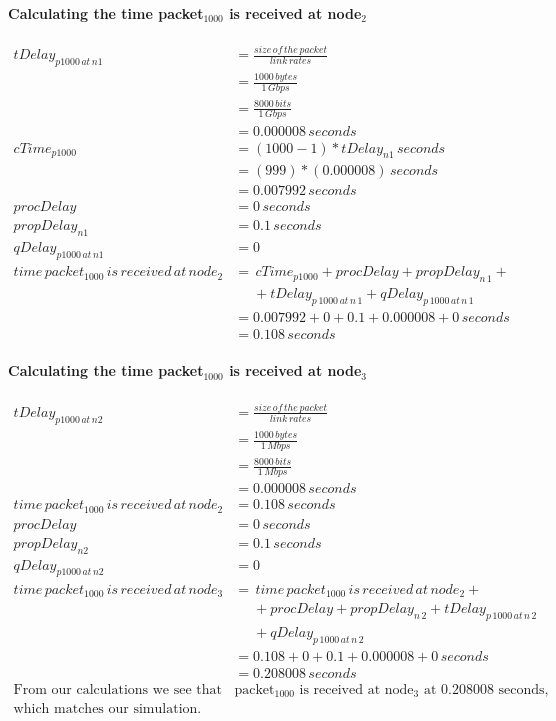 \documentclass[fleqn,11pt]{article}
\begin{document}
\paragraph{Calculating the time packet$_{1000}$ is received at node$_2$ }
\begin{align*}
tDelay_{p1000\,at\,n1} &=  \frac{size\,of\,the\,packet} {link\,rates}\\
&= \frac{1000\,bytes} {1\,Gbps}\\
&=  \frac{8000\,bits} {1\,Gbps}\\
&= 0.000008 \,seconds\\
cTime_{p1000} &= (1000-1) *tDelay_{n1}\,seconds\\
&= (999) *(0.000008)\,seconds\\
&= 0.007992\,seconds\\
procDelay &= 0\,seconds\\
propDelay_{n1} &= 0.1\,seconds\\
qDelay_{p1000\,at\,n1} &= 0\\
time\,packet_{1000}\,is\,received\,at\,node_{2} &= \,cTime_{p1000} + procDelay + propDelay_{n\,1} +\\
&\,\,\,\,\,\,\,\, + tDelay_{p\,1000\,at\,n\,1} + qDelay_{p\,1000\,at\,n\,1}\\
&= 0.007992 + 0 + 0.1 + 0.000008 + 0\,seconds\\
&= 0.108\,seconds
\end{align*}

\paragraph{Calculating the time packet$_{1000}$ is received at node$_3$ }
\begin{align*}
tDelay_{p1000\,at\,n2} &=  \frac{size\,of\,the\,packet} {link\,rates}\\
&= \frac{1000\,bytes} {1\,Mbps}\\
&=  \frac{8000\,bits} {1\,Mbps}\\
&= 0.000008 \,seconds\\
time\,packet_{1000}\,is\,received\,at\,node_{2} &= 0.108\,seconds\\
procDelay &= 0\,seconds\\
propDelay_{n2} &= 0.1\,seconds\\
qDelay_{p1000\,at\,n2} &= 0\\
time\,packet_{1000}\,is\,received\,at\,node_{3} &= \,time\,packet_{1000}\,is\,received\,at\,node_{2} + \\
&\,\,\,\,\,\,\,\, + procDelay + propDelay_{n\,2} + tDelay_{p\,1000\,at\,n\,2} \\
&\,\,\,\,\,\,\,\, + qDelay_{p\,1000\,at\,n\,2}\\
&= 0.108 + 0 + 0.1 + 0.000008 + 0\,seconds\\
&= 0.208008\,seconds \\
\text{From our calculations we see that }
&\text{packet$_{1000}$ is received at node$_3$ at 0.208008 seconds,} \\
\text{which matches our simulation.}
\end{align*}
\end{document}

